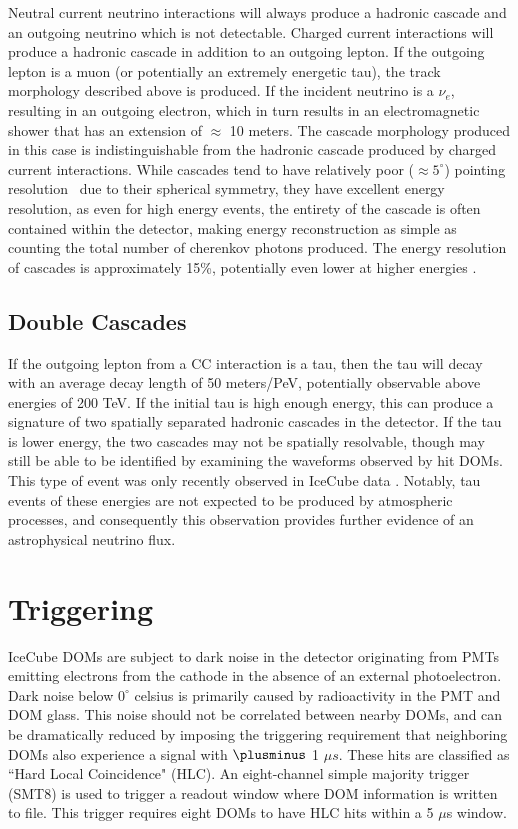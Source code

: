 Neutral current neutrino interactions will always produce a hadronic cascade and an outgoing neutrino which is not detectable. Charged current interactions will produce a hadronic cascade in addition to an outgoing lepton. If the outgoing lepton is a muon (or potentially an extremely energetic tau), the track morphology described above is produced. If the incident neutrino is a $\nu_e$, resulting in an outgoing electron, which in turn results in an electromagnetic shower that has an extension of $\approx$ 10 meters. The cascade morphology produced in this case is indistinguishable from the hadronic cascade produced by charged current interactions. While cascades tend to have relatively poor ($\approx 5^{\circ}$) pointing resolution~\cite{cascade_dnn_paper} due to their spherical symmetry, they have excellent energy resolution, as even for high energy events, the entirety of the cascade is often contained within the detector, making energy reconstruction as simple as counting the total number of cherenkov photons produced. The energy resolution of cascades is approximately 15\%, potentially even lower at higher energies \cite{AustinThesis}.


\subsection{Double Cascades}
If the outgoing lepton from a CC interaction is a tau, then the tau will decay with an average decay length of 50 meters/PeV, potentially observable above energies of 200 TeV. If the initial tau is high enough energy, this can produce a signature of two spatially separated hadronic cascades in the detector. If the tau is lower energy, the two cascades may not be spatially resolvable, though may still be able to be identified by examining the waveforms observed by hit DOMs. This type of event was only recently observed in IceCube data \cite{taupaper}. Notably, tau events of these energies are not expected to be produced by atmospheric processes, and consequently this observation provides further evidence of an astrophysical neutrino flux. 

\section{Triggering}
IceCube DOMs are subject to dark noise in the detector originating from PMTs emitting electrons from the cathode in the absence of an external photoelectron. Dark noise below $0^{\circ}$ celsius is primarily caused by radioactivity in the PMT and DOM glass. This noise should not be correlated between nearby DOMs, and can be dramatically reduced by imposing the triggering requirement that neighboring DOMs also experience a signal with $\plusminus$ 1 $\mu s$. These hits are classified as ``Hard Local Coincidence" (HLC). An eight-channel simple majority trigger (SMT8) is used to trigger a readout window where DOM information is written to file. This trigger requires eight DOMs to have HLC hits within a 5 $\mu$s window. 

